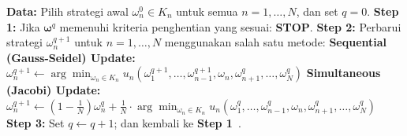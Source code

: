 \begin{algorithm}[htbp]
\caption[Iterative Best Response Algorithm]{Iterative Best Response Algorithm }
\label{alg:best_response}
\begin{algorithmic}[1]
\State \textbf{Data:} Pilih strategi awal $\omega_n^0 \in K_n$ untuk semua $n = 1, \dots, N$, dan set $q = 0$.
\State \textbf{Step 1:} Jika $\mathbf{\omega}^q$ memenuhi kriteria penghentian yang sesuai: \textbf{STOP}.
\State \textbf{Step 2:} Perbarui strategi $\omega_n^{q+1}$ untuk $n = 1, \dots, N$ menggunakan salah satu metode:
    \State \quad \textbf{Sequential (Gauss-Seidel) Update:}
    \State \quad $\omega_n^{q+1} \leftarrow \arg \min_{\omega_n \in K_n} u_n(\omega_1^{q+1}, \dots, \omega_{n-1}^{q+1}, \omega_n, \omega_{n+1}^q, \dots, \omega_N^q)$
    \State \quad \textbf{Simultaneous (Jacobi) Update:}
    \State \quad $\omega_n^{q+1} \leftarrow (1 - \frac{1}{N})\omega_n^q + \frac{1}{N} \cdot \arg \min_{\omega_n \in K_n} u_n(\omega_1^q, \dots, \omega_{n-1}^q, \omega_n, \omega_{n+1}^q, \dots, \omega_N^q)$
\State \textbf{Step 3:} Set $q \leftarrow q + 1$; dan kembali ke \textbf{Step 1}~\cite{monderer_potential_1996}.
\end{algorithmic}
\end{algorithm}

